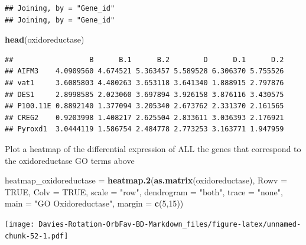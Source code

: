 \documentclass[
]{article}
\newenvironment{Shaded}{\begin{snugshade}}{\end{snugshade}}
\newcommand{\DataTypeTok}[1]{\textcolor[rgb]{0.13,0.29,0.53}{#1}}
\newcommand{\DecValTok}[1]{\textcolor[rgb]{0.00,0.00,0.81}{#1}}
\newcommand{\KeywordTok}[1]{\textcolor[rgb]{0.13,0.29,0.53}{\textbf{#1}}}
\newcommand{\NormalTok}[1]{#1}
\newcommand{\OtherTok}[1]{\textcolor[rgb]{0.56,0.35,0.01}{#1}}
\newcommand{\StringTok}[1]{\textcolor[rgb]{0.31,0.60,0.02}{#1}}
\begin{document}
\begin{verbatim}
## Joining, by = "Gene_id"
## Joining, by = "Gene_id"
\end{verbatim}

\begin{Shaded}
\begin{Highlighting}[]
\KeywordTok{head}\NormalTok{(oxidoreductase)}
\end{Highlighting}
\end{Shaded}

\begin{verbatim}
##                  B      B.1      B.2        D      D.1      D.2
## AIFM3    4.0909560 4.674521 5.363457 5.589528 6.306370 5.755526
## vat1     3.6085803 4.480263 3.653118 3.641340 1.888915 2.797876
## DES1     2.8998585 2.023060 3.697894 3.926158 3.876116 3.430575
## P100.11E 0.8892140 1.377094 3.205340 2.673762 2.331370 2.161565
## CREG2    0.9203998 1.408217 2.625504 2.833611 3.036393 2.176921
## Pyroxd1  3.0444119 1.586754 2.484778 2.773253 3.163771 1.947959
\end{verbatim}

Plot a heatmap of the differential expression of ALL the genes that
correspond to the oxidoreductase GO terms above

\begin{Shaded}
\begin{Highlighting}[]
\NormalTok{heatmap_oxidoreductase =}\StringTok{ }\KeywordTok{heatmap.2}\NormalTok{(}\KeywordTok{as.matrix}\NormalTok{(oxidoreductase), }\DataTypeTok{Rowv =} \OtherTok{TRUE}\NormalTok{, }\DataTypeTok{Colv =} \OtherTok{TRUE}\NormalTok{, }\DataTypeTok{scale =} \StringTok{"row"}\NormalTok{,}
                               \DataTypeTok{dendrogram =} \StringTok{"both"}\NormalTok{,}
                               \DataTypeTok{trace =} \StringTok{"none"}\NormalTok{,}
                               \DataTypeTok{main =} \StringTok{"GO Oxidoreductase"}\NormalTok{,}
                               \DataTypeTok{margin =} \KeywordTok{c}\NormalTok{(}\DecValTok{5}\NormalTok{,}\DecValTok{15}\NormalTok{))}
\end{Highlighting}
\end{Shaded}

\texttt{[image: Davies-Rotation-OrbFav-BD-Markdown\_files/figure-latex/unnamed-chunk-52-1.pdf]}
\end{document}
